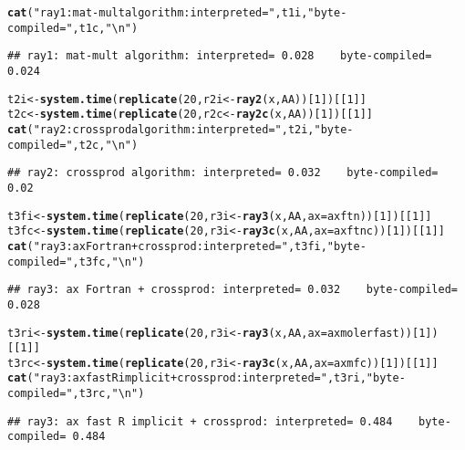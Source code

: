\documentclass[10pt]{article}\usepackage[]{graphicx}\usepackage[]{color}
\makeatletter
\newcommand{\hlnum}[1]{\textcolor[rgb]{0.686,0.059,0.569}{#1}}%
\newcommand{\hlstr}[1]{\textcolor[rgb]{0.192,0.494,0.8}{#1}}%
\newcommand{\hlstd}[1]{\textcolor[rgb]{0.345,0.345,0.345}{#1}}%
\newcommand{\hlkwb}[1]{\textcolor[rgb]{0.69,0.353,0.396}{#1}}%
\newcommand{\hlkwc}[1]{\textcolor[rgb]{0.333,0.667,0.333}{#1}}%
\newcommand{\hlkwd}[1]{\textcolor[rgb]{0.737,0.353,0.396}{\textbf{#1}}}%
\newenvironment{kframe}{%
 \def\at@end@of@kframe{}%
 \ifinner\ifhmode%
  \def\at@end@of@kframe{\end{minipage}}%
  \begin{minipage}{\columnwidth}%
 \fi\fi%
 \def\FrameCommand##1{\hskip\@totalleftmargin \hskip-\fboxsep
 \colorbox{shadecolor}{##1}\hskip-\fboxsep
     \hskip-\linewidth \hskip-\@totalleftmargin \hskip\columnwidth}%
 \MakeFramed {\advance\hsize-\width
   \@totalleftmargin\z@ \linewidth\hsize
   \@setminipage}}%
 {\par\unskip\endMakeFramed%
 \at@end@of@kframe}
\newenvironment{knitrout}{}{} %
\makeatother
\begin{document}
\begin{knitrout}
\begin{kframe}
\begin{alltt}
  \hlkwd{cat}\hlstd{(}\hlstr{"ray1: mat-mult algorithm: interpreted="}\hlstd{,t1i,}\hlstr{"   byte-compiled="}\hlstd{,t1c,}\hlstr{"\textbackslash{}n"}\hlstd{)}
\end{alltt}
\begin{verbatim}
## ray1: mat-mult algorithm: interpreted= 0.028    byte-compiled= 0.024
\end{verbatim}
\begin{alltt}
  \hlstd{t2i}\hlkwb{<-}\hlkwd{system.time}\hlstd{(}\hlkwd{replicate}\hlstd{(}\hlnum{20}\hlstd{,r2i}\hlkwb{<-}\hlkwd{ray2}\hlstd{(x, AA))[}\hlnum{1}\hlstd{])[[}\hlnum{1}\hlstd{]]}
  \hlstd{t2c}\hlkwb{<-}\hlkwd{system.time}\hlstd{(}\hlkwd{replicate}\hlstd{(}\hlnum{20}\hlstd{,r2c}\hlkwb{<-}\hlkwd{ray2c}\hlstd{(x, AA))[}\hlnum{1}\hlstd{])[[}\hlnum{1}\hlstd{]]}
  \hlkwd{cat}\hlstd{(}\hlstr{"ray2: crossprod algorithm: interpreted="}\hlstd{,t2i,}\hlstr{"   byte-compiled="}\hlstd{,t2c,}\hlstr{"\textbackslash{}n"}\hlstd{)}
\end{alltt}
\begin{verbatim}
## ray2: crossprod algorithm: interpreted= 0.032    byte-compiled= 0.02
\end{verbatim}
\begin{alltt}
  \hlstd{t3fi}\hlkwb{<-}\hlkwd{system.time}\hlstd{(}\hlkwd{replicate}\hlstd{(}\hlnum{20}\hlstd{,r3i}\hlkwb{<-}\hlkwd{ray3}\hlstd{(x, AA,} \hlkwc{ax}\hlstd{=axftn))[}\hlnum{1}\hlstd{])[[}\hlnum{1}\hlstd{]]}
  \hlstd{t3fc}\hlkwb{<-}\hlkwd{system.time}\hlstd{(}\hlkwd{replicate}\hlstd{(}\hlnum{20}\hlstd{,r3i}\hlkwb{<-}\hlkwd{ray3c}\hlstd{(x, AA,} \hlkwc{ax}\hlstd{=axftnc))[}\hlnum{1}\hlstd{])[[}\hlnum{1}\hlstd{]]}
  \hlkwd{cat}\hlstd{(}\hlstr{"ray3: ax Fortran + crossprod: interpreted="}\hlstd{,t3fi,}\hlstr{"   byte-compiled="}\hlstd{,t3fc,}\hlstr{"\textbackslash{}n"}\hlstd{)}
\end{alltt}
\begin{verbatim}
## ray3: ax Fortran + crossprod: interpreted= 0.032    byte-compiled= 0.028
\end{verbatim}
\begin{alltt}
  \hlstd{t3ri}\hlkwb{<-}\hlkwd{system.time}\hlstd{(}\hlkwd{replicate}\hlstd{(}\hlnum{20}\hlstd{,r3i}\hlkwb{<-}\hlkwd{ray3}\hlstd{(x, AA,} \hlkwc{ax}\hlstd{=axmolerfast))[}\hlnum{1}\hlstd{])[[}\hlnum{1}\hlstd{]]}
  \hlstd{t3rc}\hlkwb{<-}\hlkwd{system.time}\hlstd{(}\hlkwd{replicate}\hlstd{(}\hlnum{20}\hlstd{,r3i}\hlkwb{<-}\hlkwd{ray3c}\hlstd{(x, AA,} \hlkwc{ax}\hlstd{=axmfc))[}\hlnum{1}\hlstd{])[[}\hlnum{1}\hlstd{]]}
  \hlkwd{cat}\hlstd{(}\hlstr{"ray3: ax fast R implicit + crossprod: interpreted="}\hlstd{,t3ri,}\hlstr{"   byte-compiled="}\hlstd{,t3rc,}\hlstr{"\textbackslash{}n"}\hlstd{)}
\end{alltt}
\begin{verbatim}
## ray3: ax fast R implicit + crossprod: interpreted= 0.484    byte-compiled= 0.484
\end{verbatim}
\end{kframe}
\end{knitrout}
\end{document}
